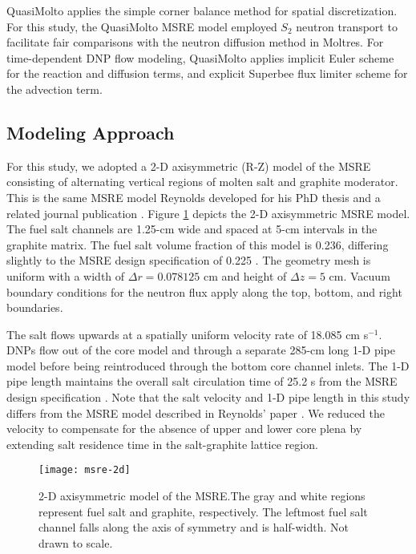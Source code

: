 QuasiMolto applies the simple corner balance method
\cite{adams_subcell_1997} for spatial discretization.
For this study, the QuasiMolto \gls{MSRE} model employed $S_2$ neutron transport to facilitate
fair comparisons with the neutron diffusion method in Moltres. For time-dependent \gls{DNP} flow
modeling, QuasiMolto applies implicit Euler scheme for the reaction
and diffusion terms, and explicit Superbee flux limiter scheme for the advection term.

\subsection{Modeling Approach}

For this study, we adopted a 2-D axisymmetric (R-Z) model of the \gls{MSRE} consisting of
alternating vertical regions of molten salt and graphite moderator. This is the same \gls{MSRE}
model Reynolds developed for his PhD thesis \cite{reynolds_multilevel_2020} and a related
journal publication \cite{reynolds_analysis_2023}. Figure \ref{fig:pump-geom} depicts the 2-D
axisymmetric \gls{MSRE} model. The fuel salt channels are 1.25-cm wide and spaced at 5-cm intervals
in the graphite matrix. The fuel salt volume fraction of this model is 0.236, differing
slightly to the \gls{MSRE} design specification of 0.225 \cite{robertson_msre_1965}. The geometry
mesh is uniform with a width of $\Delta r=0.078125$ cm and height of $\Delta z=5$ cm.
Vacuum boundary conditions for the neutron flux apply along the top, bottom, and right boundaries.

The salt flows
upwards at a spatially uniform velocity rate of 18.085 cm s$^{-1}$. \glspl{DNP} flow out of the
core model and through a separate 285-cm long 1-D pipe model before being reintroduced through the
bottom core channel inlets. The 1-D pipe length maintains the overall salt circulation time of
25.2 s from the \gls{MSRE} design specification \cite{robertson_msre_1965}. Note that the salt
velocity and 1-D pipe length in this study differs from the \gls{MSRE} model described in Reynolds'
paper \cite{reynolds_analysis_2023}. We reduced the velocity to compensate for the absence of upper
and lower core plena by extending salt residence time in the salt-graphite lattice region.

\begin{figure}[htb]
  \centering
  \texttt{[image: msre-2d]}
  \caption{2-D axisymmetric model of the \gls{MSRE}.The gray and white regions represent fuel salt
  and graphite, respectively. The leftmost fuel salt channel falls along the axis of symmetry and
  is half-width. Not drawn to scale.}
  \label{fig:pump-geom}
\end{figure}

